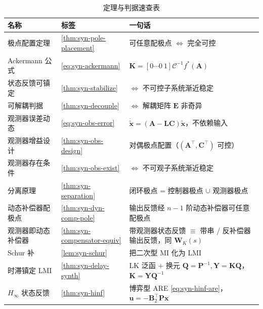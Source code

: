 \begin{table}[H]\centering\small
\caption{定理与判据速查表}
\begin{tabular}{lll}
\toprule
名称 & 标签 & 一句话 \\
\midrule
极点配置定理 & \cref{thm:syn-pole-placement} & 可任意配极点 $\iff$ 完全可控 \\
Ackermann 公式 & \cref{eq:syn-ackermann} & $\mathbf K=[0\cdots0\ 1]\mathcal C^{-1}f^*(\mathbf A)$ \\
状态反馈可镇定 & \cref{thm:syn-stabilize} & $\iff$ 不可控子系统渐近稳定 \\
可解耦判据 & \cref{thm:syn-decouple} & $\iff$ 解耦矩阵 $\mathbf E$ 非奇异 \\
观测器误差动态 & \cref{eq:syn-obs-error} & $\dot{\tilde{\mathbf x}}=(\mathbf A-\mathbf L\mathbf C)\tilde{\mathbf x}$，不依赖输入 \\
观测器增益设计 & \cref{thm:syn-obs-design} & 对偶极点配置（$(\mathbf A^\top,\mathbf C^\top)$ 可控） \\
观测器存在条件 & \cref{thm:syn-obs-exist} & $\iff$ 不可观子系统渐近稳定 \\
分离原理 & \cref{thm:syn-separation} & 闭环极点 = 控制器极点 $\cup$ 观测器极点 \\
动态补偿器配极点 & \cref{thm:syn-dyn-comp-pole} & 输出反馈经 $n-1$ 阶动态补偿器可任意配极点 \\
观测器即动态补偿器 & \cref{thm:syn-compensator-equiv} & 带观测器状态反馈 $\equiv$ 带串 / 反补偿器输出反馈，同 $\mathbf W_K(s)$ \\
Schur 补 & \cref{lem:syn-schur} & 把二次型 MI 化为 LMI \\
时滞镇定 LMI & \cref{thm:syn-delay-synth} & LK 泛函 $+$ 换元 $\mathbf Q{=}\mathbf P^{-1},\mathbf Y{=}\mathbf K\mathbf Q$，$\mathbf K{=}\mathbf Y\mathbf Q^{-1}$ \\
$H_\infty$ 状态反馈 & \cref{thm:syn-hinf} & 博弈型 ARE \cref{eq:syn-hinf-are}，$\mathbf u=-\mathbf B_2^\top\mathbf P\mathbf x$ \\
\bottomrule
\end{tabular}
\end{table}

